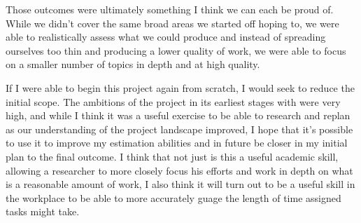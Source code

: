 Those outcomes were ultimately something I think we can each be proud of. While
we didn't cover the same broad areas we started off hoping to, we were able to
realistically assess what we could produce and instead of spreading ourselves
too thin and producing a lower quality of work, we were able to focus on a
smaller number of topics in depth and at high quality.

If I were able to begin this project again from scratch, I would seek to reduce
the initial scope. The ambitions of the project in its earliest stages
with were very high, and while I think it was a useful exercise to be able to
research and replan as our understanding of the project landscape improved, I
hope that it's possible to use it to improve my estimation abilities and in
future be closer in my initial plan to the final outcome. I think that not just
is this a useful academic skill, allowing a researcher to more closely focus his
efforts and work in depth on what is a reasonable amount of work, I also think
it will turn out to be a useful skill in the workplace to be able to more
accurately guage the length of time assigned tasks might take.
